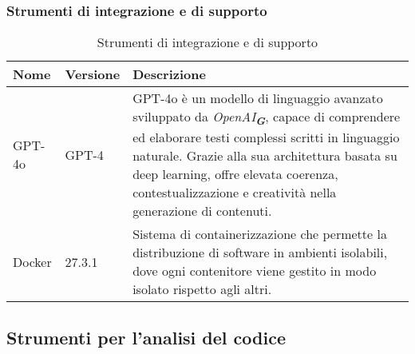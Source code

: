 \subsubsection{Strumenti di integrazione e di supporto}
\label{subsec:strumenti_integrazione_supporto}

\newpage

\begin{table}[h!]
    \centering
    \renewcommand{\arraystretch}{1.6} %
    \begin{tabularx}{\textwidth}{|p{2cm}|p{2cm}|X|} \hline
    \rowcolor[HTML]{FFD700} 
    \textbf{Nome} & \textbf{Versione} & \textbf{Descrizione} \\ 
    \hline
    GPT-4o & GPT-4 & GPT-4o è un modello di linguaggio avanzato sviluppato da \emph{OpenAI}\textsubscript{\textbf{\textit{G}}},
    capace di comprendere ed elaborare testi complessi scritti in linguaggio naturale. 
    Grazie alla sua architettura basata su deep learning, offre elevata coerenza, contestualizzazione e creatività nella generazione
    di contenuti. \\ \hline
    Docker & 27.3.1 & Sistema di containerizzazione che permette la distribuzione
    di software in ambienti isolabili, dove ogni contenitore
    viene gestito in modo isolato rispetto agli altri. \\ \hline
    \end{tabularx}
    \caption{Strumenti di integrazione e di supporto}
\end{table}

\subsection{Strumenti per l’analisi del codice}

